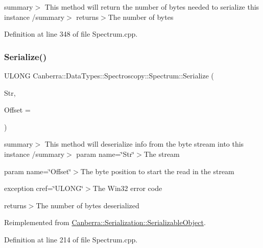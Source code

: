 summary$>$ This method will return the number of bytes needed to serialize this instance /summary$>$ returns$>$The number of bytes

Definition at line 348 of file Spectrum.\+cpp.

\mbox{\label{class_canberra_1_1_data_types_1_1_spectroscopy_1_1_spectrum_ac5f0fa880e88960afa1547a60ed8c8f4_ac5f0fa880e88960afa1547a60ed8c8f4}} 
\subsubsection{\texorpdfstring{Serialize()}{Serialize()}}
{\footnotesize\ttfamily U\+L\+O\+NG Canberra\+::\+Data\+Types\+::\+Spectroscopy\+::\+Spectrum\+::\+Serialize (\begin{DoxyParamCaption}\item[{\hyperlink{class_canberra_1_1_utility_1_1_core_1_1_byte_stream}{Canberra\+::\+Utility\+::\+Core\+::\+Byte\+Stream} \&}]{Str,  }\item[{const L\+O\+NG}]{Offset = {} }\end{DoxyParamCaption})\hspace{0.3cm}{\ttfamily [virtual]}}

summary$>$ This method will deserialize info from the byte stream into this instance /summary$>$ param name=\char`\"{}\+Str\char`\"{}$>$The stream

param name=\char`\"{}\+Offset\char`\"{}$>$The byte position to start the read in the stream

exception cref=\char`\"{}\+U\+L\+O\+N\+G\char`\"{}$>$The Win32 error code

returns$>$The number of bytes deserialized

Reimplemented from \hyperlink{class_canberra_1_1_serialization_1_1_serializable_object_a33e593c04b50f36e8dad06b3b7471a9c_a33e593c04b50f36e8dad06b3b7471a9c}{Canberra\+::\+Serialization\+::\+Serializable\+Object}.



Definition at line 214 of file Spectrum.\+cpp.

\mbox{\label{class_canberra_1_1_data_types_1_1_spectroscopy_1_1_spectrum_adf7ad1009e06e12a15344e479cede754_adf7ad1009e06e12a15344e479cede754}} 
